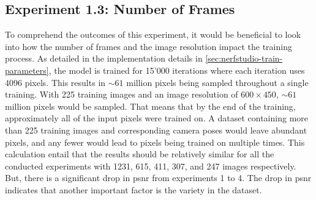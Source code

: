 

















\subsection{Experiment 1.3: Number of Frames}


To comprehend the outcomes of this experiment, it would be beneficial to look into how the number of frames and the image resolution impact the training process. As detailed in the implementation details in \autoref{sec:nerfstudio-train-parameters}, the model is trained for 15'000 iterations where each iteration uses 4096 pixels. This results in $\sim61$ million pixels being sampled throughout a single training. With 225 training images and an image resolution of $600 \times 450$, $\sim61$ million pixels would be sampled. That means that by the end of the training, approximately all of the input pixels were trained on. A dataset containing more than 225 training images and corresponding camera poses would leave abundant pixels, and any fewer would lead to pixels being trained on multiple times. This calculation entail that the results should be relatively similar for all the conducted experiments with 1231, 615, 411, 307, and 247 images respectively. But, there is a significant drop in \acrshort{psnr} from experiments 1 to 4. The drop in \acrshort{psnr} indicates that another important factor is the variety in the dataset.














